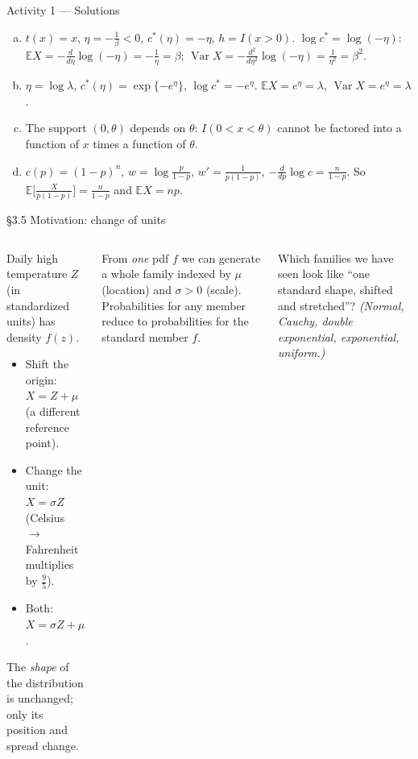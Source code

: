 \documentclass[aspectratio=169,t,10pt]{beamer}
\newcommand{\E}{\mathbb{E}}
\newcommand{\Var}{\operatorname{Var}}
\begin{document}
\begin{frame}[t]{Activity 1 --- Solutions}
  \small
  \begin{enumerate}[(a)]
    \item $t(x)=x$, $\eta=-\frac1\beta<0$, $c^*(\eta)=-\eta$, $h=I(x>0)$. $\log c^*=\log(-\eta)$: $\E X=-\frac d{d\eta}\log(-\eta)=-\frac1\eta=\beta$; $\Var X=-\frac{d^2}{d\eta^2}\log(-\eta)=\frac1{\eta^2}=\beta^2$.
    \item $\eta=\log\lambda$, $c^*(\eta)=\exp\{-e^\eta\}$, $\log c^*=-e^\eta$. $\E X=e^\eta=\lambda$, $\Var X=e^\eta=\lambda$.
    \item The support $(0,\theta)$ depends on $\theta$: $I(0<x<\theta)$ cannot be factored into a function of $x$ times a function of $\theta$.
    \item $c(p)=(1-p)^n$, $w=\log\frac p{1-p}$, $w'=\frac1{p(1-p)}$, $-\frac d{dp}\log c=\frac n{1-p}$. So $\E\bigl[\frac{X}{p(1-p)}\bigr]=\frac n{1-p}$ and $\E X=np$.
  \end{enumerate}
\end{frame}

\begin{frame}{\S3.5 Motivation: change of units}
  \begin{columns}[T]
  \begin{tcolorbox}[myex={A temperature example}]\small
  Daily high temperature $Z$ (in standardized units) has density $f(z)$.
  \begin{itemize}
    \item Shift the origin: $X=Z+\mu$ (a different reference point).
    \item Change the unit: $X=\sigma Z$ (Celsius $\to$ Fahrenheit multiplies by $\tfrac95$).
    \item Both: $X=\sigma Z+\mu$.
  \end{itemize}
  The \emph{shape} of the distribution is unchanged; only its position and spread change.
  \end{tcolorbox}
  \begin{tcolorbox}[mydef={The idea}]\small
  From \emph{one} pdf $f$ we can generate a whole family indexed by $\mu$ (location) and $\sigma>0$ (scale). Probabilities for any member reduce to probabilities for the standard member $f$.
  \end{tcolorbox}
  \begin{tcolorbox}[myquiz={Think}]\small
  Which families we have seen look like ``one standard shape, shifted and stretched''? \emph{(Normal, Cauchy, double exponential, exponential, uniform.)}
  \end{tcolorbox}
  \end{columns}
\end{frame}
\end{document}
